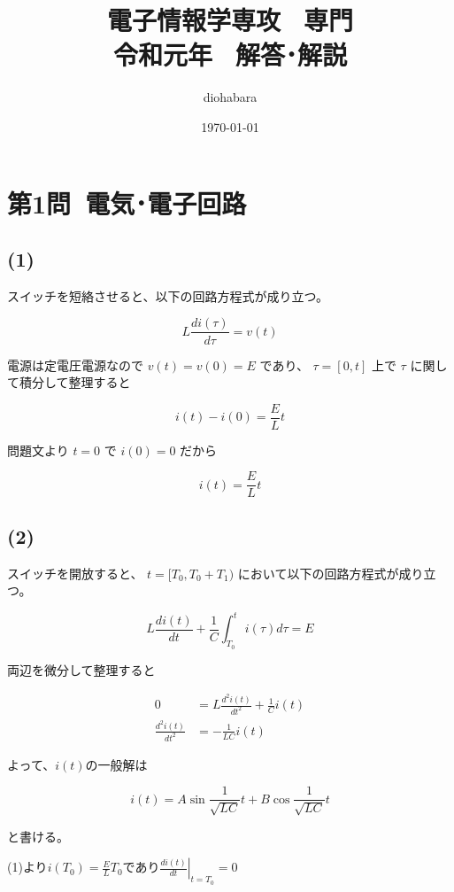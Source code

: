 \documentclass[a4paper,12pt,xelatex,ja=standard]{bxjsarticle}
\title{電子情報学専攻 \, 専門 \\ 令和元年 \, 解答･解説}
\author{diohabara}
\date{\today}
\begin{document}
\maketitle

\section*{第1問\ 電気･電子回路}

\subsection*{(1)}


スイッチを短絡させると、以下の回路方程式が成り立つ。

\[
  L \frac{d i(\tau)}{d \tau} = v(t)
\]

電源は定電圧電源なので \(v(t) = v(0) = E\) であり、 \(\tau = [0, t]\) 上で \(\tau\) に関して積分して整理すると

\[
  i(t) - i(0) = \frac{E}{L}t
\]

問題文より $t = 0$ で $i(0) = 0$ だから

\[
  i(t) = \frac{E}{L}t
\]

\subsection*{(2)}

スイッチを開放すると、 \(t = [T_0, T_0 + T_1)\) において以下の回路方程式が成り立つ。

\[
  L \frac{d i(t)}{d t} + \frac{1}{C}\int^{t}_{T_0}i(\tau) d \tau = E
\]

両辺を微分して整理すると

\begin{equation*}
  \begin{split}
    0 &= L \frac{d^2 i(t)}{dt^2} + \frac{1}{C}i(t) \\
    \frac{d^2 i(t)}{dt^2} &= - \frac{1}{LC} i(t)
  \end{split}
\end{equation*}

よって、\(i(t)\)の一般解は

\[
  i(t) = A \sin{\frac{1}{\sqrt{LC}}}t+ B \cos{\frac{1}{\sqrt{LC}}}t
\]

と書ける。

(1)より\(i(T_0) = \frac{E}{L}T_0\)であり\(\left.\frac{di(t)}{dt}\right|_{t=T_0}=0\)
\end{document}
